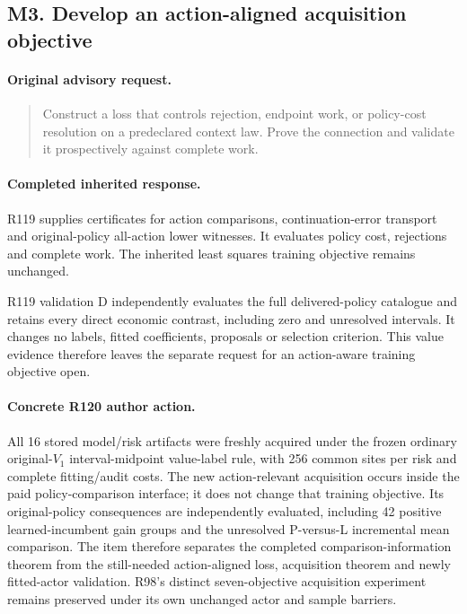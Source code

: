 \subsection{M3. Develop an action-aligned acquisition objective}
\label{response120:M3}
\paragraph{Original advisory request.}
\begin{quote}
Construct a loss that controls rejection, endpoint work, or policy-cost resolution on a predeclared context law. Prove the connection and validate it prospectively against complete work.
\end{quote}
\paragraph{Completed inherited response.}
R119 supplies certificates for action comparisons, continuation-error transport and original-policy all-action lower witnesses. It evaluates policy cost, rejections and complete work. The inherited least squares training objective remains unchanged.

R119 validation D independently evaluates the full delivered-policy catalogue and retains every direct economic contrast, including zero and unresolved intervals. It changes no labels, fitted coefficients, proposals or selection criterion. This value evidence therefore leaves the separate request for an action-aware training objective open.
\paragraph{Concrete R120 author action.}
All 16 stored model/risk artifacts were freshly acquired under the frozen ordinary original-$V_1$ interval-midpoint value-label rule, with 256 common sites per risk and complete fitting/audit costs. The new action-relevant acquisition occurs inside the paid policy-comparison interface; it does not change that training objective. Its original-policy consequences are independently evaluated, including 42 positive learned-incumbent gain groups and the unresolved P-versus-L incremental mean comparison. The item therefore separates the completed comparison-information theorem from the still-needed action-aligned loss, acquisition theorem and newly fitted-actor validation. R98's distinct seven-objective acquisition experiment remains preserved under its own unchanged actor and sample barriers.

